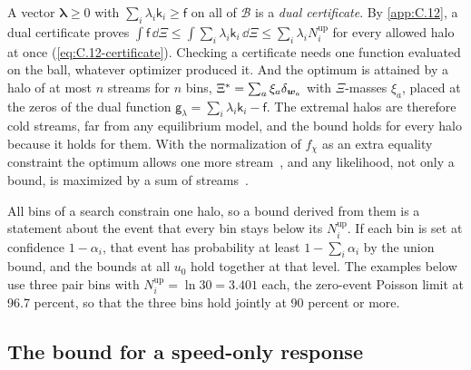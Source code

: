 A vector $\boldsymbol\lambda \ge 0$ with $\sum_i\lambda_i\mathsf{k}_i \ge \mathsf{f}$ on all of $\mathcal{B}$ is a \emph{dual certificate}. By \cref{app:C.12}, a dual certificate proves $\int\mathsf{f}\,\dd\Xi \le \int\sum_i\lambda_i\mathsf{k}_i\,\dd\Xi \le \sum_i\lambda_iN_i^{\mathrm{up}}$ for every allowed halo at once (\cref{eq:C.12-certificate}). Checking a certificate needs one function evaluated on the ball, whatever optimizer produced it. And the optimum is attained by a halo of at most $n$ streams for $n$ bins, $\Xi^* = \sum_a\xi_a\delta_{\bm{w}_a}$ with $\Xi$-masses $\xi_a$, placed at the zeros of the dual function $\mathsf{g}_\lambda = \sum_i\lambda_i\mathsf{k}_i - \mathsf{f}$. The extremal halos are therefore cold streams, far from any equilibrium model, and the bound holds for every halo because it holds for them. With the normalization of $f_\chi$ as an extra equality constraint the optimum allows one more stream~\cite[Eqs.~(14)--(19)]{ibarra2017optimized}, and any likelihood, not only a bound, is maximized by a sum of streams~\cite{gelmini2017unified}.

All bins of a search constrain one halo, so a bound derived from them is a statement about the event that every bin stays below its $N_i^{\mathrm{up}}$. If each bin is set at confidence $1 - \alpha_i$, that event has probability at least $1 - \sum_i\alpha_i$ by the union bound, and the bounds at all $u_0$ hold together at that level. The examples below use three pair bins with $N_i^{\mathrm{up}} = \ln 30 = 3.401$ each, the zero-event Poisson limit at 96.7 percent, so that the three bins hold jointly at 90 percent or more.

\subsection{The bound for a speed-only response}\label{sec:21.2-iso}

